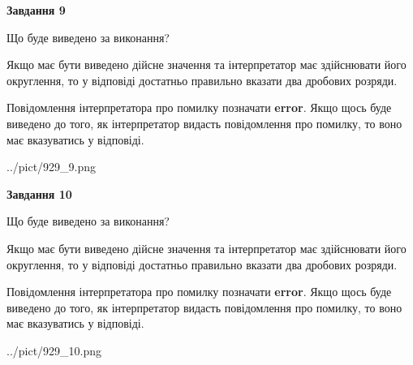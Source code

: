 \documentclass[12pt, ukrainian]{article}
\begin{document}
{\begin {Large}
{\begin {center}\textbf{Завдання 9}\end {center}}\par
Що буде виведено за виконання? \par

Якщо має бути виведено дійсне значення та інтерпретатор має здійснювати його округлення, 
то у відповіді достатньо правильно вказати два дробових розряди.

Повідомлення інтерпретатора про помилку позначати \textbf{error}.
Якщо щось буде виведено до того, як інтерпретатор видасть повідомлення про помилку, 
то воно має вказуватись у відповіді. \par

\begin{center}
	{../pict/929_9.png}
\end{center}
\newpage

{\begin {center}\textbf{Завдання 10}\end {center}}\par
Що буде виведено за виконання? \par

Якщо має бути виведено дійсне значення та інтерпретатор має здійснювати його округлення, 
то у відповіді достатньо правильно вказати два дробових розряди.

Повідомлення інтерпретатора про помилку позначати \textbf{error}.
Якщо щось буде виведено до того, як інтерпретатор видасть повідомлення про помилку, 
то воно має вказуватись у відповіді. \par

\begin{center}
	{../pict/929_10.png}
\end{center}
\newpage

\end {Large}}
\end{document}
